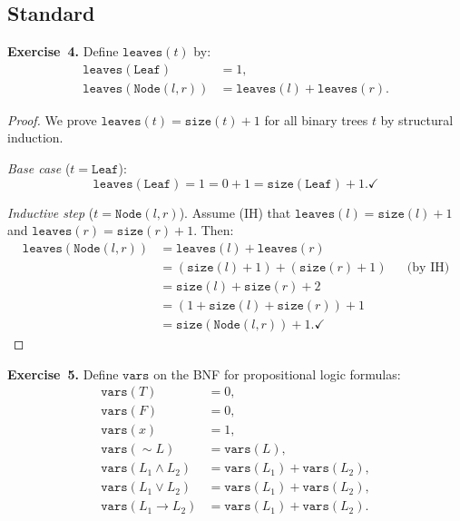 \documentclass[11pt]{article}
\begin{document}
\subsection*{Standard}

\textbf{Exercise~4.}
Define $\texttt{leaves}(t)$ by:
\begin{align*}
  \texttt{leaves}(\texttt{Leaf}) &= 1, \\
  \texttt{leaves}(\texttt{Node}(l, r)) &= \texttt{leaves}(l) + \texttt{leaves}(r).
\end{align*}

\begin{proof}
We prove $\texttt{leaves}(t) = \texttt{size}(t) + 1$ for all binary trees
$t$ by structural induction.

\emph{Base case} ($t = \texttt{Leaf}$):
\[
  \texttt{leaves}(\texttt{Leaf}) = 1 = 0 + 1 = \texttt{size}(\texttt{Leaf}) + 1. \checkmark
\]

\emph{Inductive step} ($t = \texttt{Node}(l, r)$).
Assume (IH) that $\texttt{leaves}(l) = \texttt{size}(l) + 1$ and
$\texttt{leaves}(r) = \texttt{size}(r) + 1$. Then:
\begin{align*}
  \texttt{leaves}(\texttt{Node}(l, r))
    &= \texttt{leaves}(l) + \texttt{leaves}(r) \\
    &= (\texttt{size}(l) + 1) + (\texttt{size}(r) + 1) && \text{(by IH)} \\
    &= \texttt{size}(l) + \texttt{size}(r) + 2 \\
    &= (1 + \texttt{size}(l) + \texttt{size}(r)) + 1 \\
    &= \texttt{size}(\texttt{Node}(l, r)) + 1. \checkmark
\end{align*}
\end{proof}

\medskip
\textbf{Exercise~5.}
Define $\texttt{vars}$ on the BNF for propositional logic formulas:
\begin{align*}
  \texttt{vars}(T) &= 0, \\
  \texttt{vars}(F) &= 0, \\
  \texttt{vars}(x) &= 1, \\
  \texttt{vars}({\sim} L) &= \texttt{vars}(L), \\
  \texttt{vars}(L_1 \wedge L_2) &= \texttt{vars}(L_1) + \texttt{vars}(L_2), \\
  \texttt{vars}(L_1 \vee L_2) &= \texttt{vars}(L_1) + \texttt{vars}(L_2), \\
  \texttt{vars}(L_1 \to L_2) &= \texttt{vars}(L_1) + \texttt{vars}(L_2).
\end{align*}
\end{document}
